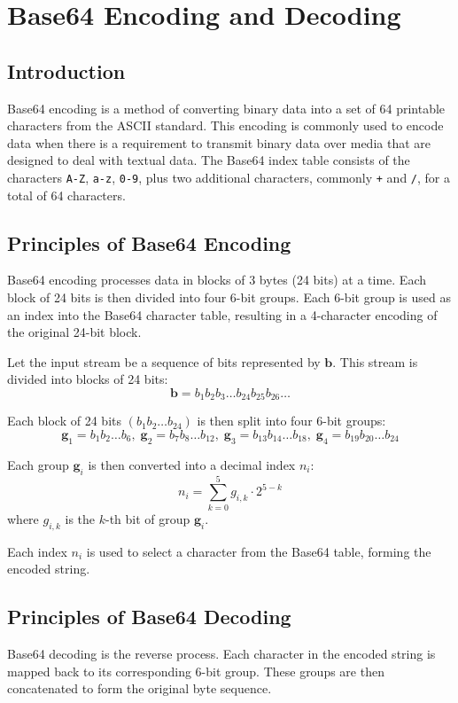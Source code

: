 \chapter{Base64 Encoding and Decoding}

\section{Introduction}
Base64 encoding is a method of converting binary data into a set of 64 printable characters from the ASCII standard. This encoding is commonly used to encode data when there is a requirement to transmit binary data over media that are designed to deal with textual data. The Base64 index table consists of the characters \texttt{A-Z}, \texttt{a-z}, \texttt{0-9}, plus two additional characters, commonly \texttt{+} and \texttt{/}, for a total of 64 characters.

\section{Principles of Base64 Encoding}
Base64 encoding processes data in blocks of 3 bytes (24 bits) at a time. Each block of 24 bits is then divided into four 6-bit groups. Each 6-bit group is used as an index into the Base64 character table, resulting in a 4-character encoding of the original 24-bit block.

Let the input stream be a sequence of bits represented by $\mathbf{b}$. This stream is divided into blocks of 24 bits:
\[\mathbf{b} = b_1 b_2 b_3 \ldots b_{24} b_{25} b_{26} \ldots\]

Each block of 24 bits $(b_1 b_2 \ldots b_{24})$ is then split into four 6-bit groups:
\[\mathbf{g}_1 = b_1 b_2 \ldots b_6, \; \mathbf{g}_2 = b_7 b_8 \ldots b_{12}, \; \mathbf{g}_3 = b_{13} b_{14} \ldots b_{18}, \; \mathbf{g}_4 = b_{19} b_{20} \ldots b_{24}\]

Each group $\mathbf{g}_i$ is then converted into a decimal index $n_i$:
\[n_i = \sum_{k=0}^{5} g_{i,k} \cdot 2^{5-k}\]
where $g_{i,k}$ is the $k$-th bit of group $\mathbf{g}_i$.

Each index $n_i$ is used to select a character from the Base64 table, forming the encoded string.

\section{Principles of Base64 Decoding}
Base64 decoding is the reverse process. Each character in the encoded string is mapped back to its corresponding 6-bit group. These groups are then concatenated to form the original byte sequence.

